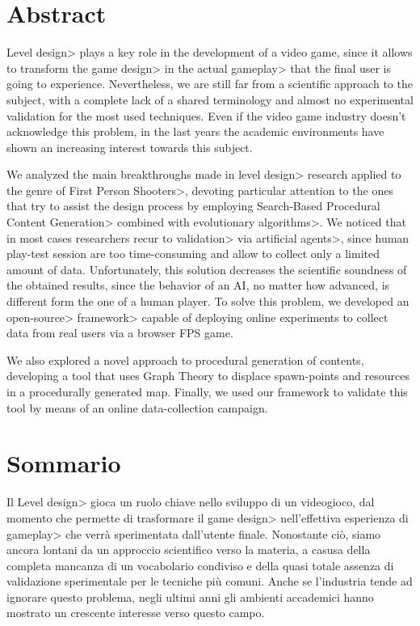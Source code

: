 \chapter{Abstract}

\<Level design> plays a key role in the development of a video game, since it allows to transform the \<game design> in the actual \<gameplay> that the final user is going to experience. Nevertheless, we are still far from a scientific approach to the subject, with a complete lack of a shared terminology and almost no experimental validation for the most used techniques. Even if the video game industry doesn't acknowledge this problem, in the last years the academic environments have shown an increasing interest towards this subject.

\par

We analyzed the main breakthroughs made in \<level design> research applied to the genre of \<First Person Shooters>, devoting particular attention to the ones that try to assist the design process by employing \<Search-Based Procedural Content Generation> combined with \<evolutionary algorithms>. We noticed that in most cases researchers recur to \<validation> via \<artificial agents>, since human play-test session are too time-consuming and allow to collect only a limited amount of data. Unfortunately, this solution decreases the scientific soundness of the obtained results, since the behavior of an AI, no matter how advanced, is different form the one of a human player. To solve this problem, we developed an \<open-source> \<framework> capable of deploying online experiments to collect data from real users via a browser FPS game.

\par

We also explored a novel approach to procedural generation of contents, developing a tool that uses Graph Theory to displace spawn-points and resources in a procedurally generated map. Finally, we used our framework to validate this tool by means of an online data-collection campaign. 

\chapter{Sommario}

Il \<Level design> gioca un ruolo chiave nello sviluppo di un videogioco, dal momento che permette di trasformare il \<game design> nell'effettiva esperienza di \<gameplay> che verrà sperimentata dall'utente finale. Nonostante ciò, siamo ancora lontani da un approccio scientifico verso la materia, a casusa della completa mancanza di un vocabolario condiviso e della quasi totale assenza di validazione sperimentale per le tecniche più comuni. Anche se l'industria tende ad ignorare questo problema, negli ultimi anni gli ambienti accademici hanno mostrato un crescente interesse verso questo campo.

